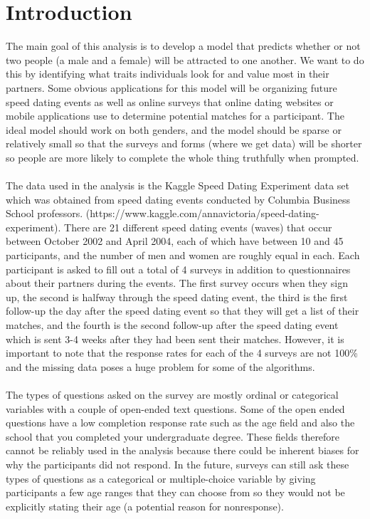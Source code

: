 \documentclass{article}
\begin{document}
\section{Introduction}
The main goal of this analysis is to develop a model that predicts whether or not two people (a male and a female) will be attracted to one another.  We want to do this by identifying what traits individuals look for and value most in their partners. Some obvious applications for this model will be organizing future speed dating events as well as online surveys that online dating websites or mobile applications use to determine potential matches for a participant. The ideal model should work on both genders, and the model should be sparse or relatively small so that the surveys and forms (where we get data) will be shorter so people are more likely to complete the whole thing truthfully when prompted.\\
\null\\
The data used in the analysis is the Kaggle Speed Dating Experiment data set which was obtained from speed dating events conducted by Columbia Business School professors.  (https://www.kaggle.com/annavictoria/speed-dating-experiment). There are 21 different speed dating events (waves) that occur between October 2002 and April 2004, each of which have between 10 and 45 participants, and the number of men and women are roughly equal in each.  Each participant is asked to fill out a total of 4 surveys in addition to questionnaires about their partners during the events.  The first survey occurs when they sign up, the second is halfway through the speed dating event, the third is the first follow-up the day after the speed dating event so that they will get a list of their matches, and the fourth is the second follow-up after the speed dating event which is sent 3-4 weeks after they had been sent their matches. However, it is important to note that the response rates for each of the 4 surveys are not 100\% and the missing data poses a huge problem for some of the algorithms.\\
\null\\
The types of questions asked on the survey are mostly ordinal or categorical variables with a couple of open-ended text questions.  Some of the open ended questions have a low completion response rate such as the age field and also the school that you completed your undergraduate degree.  These fields therefore cannot be reliably used in the analysis because there could be inherent biases for why the participants did not respond. In the future, surveys can still ask these types of questions as a categorical or multiple-choice variable by giving participants a few age ranges that they can choose from so they would not be explicitly stating their age (a potential reason for nonresponse). 
%
\end{document}
